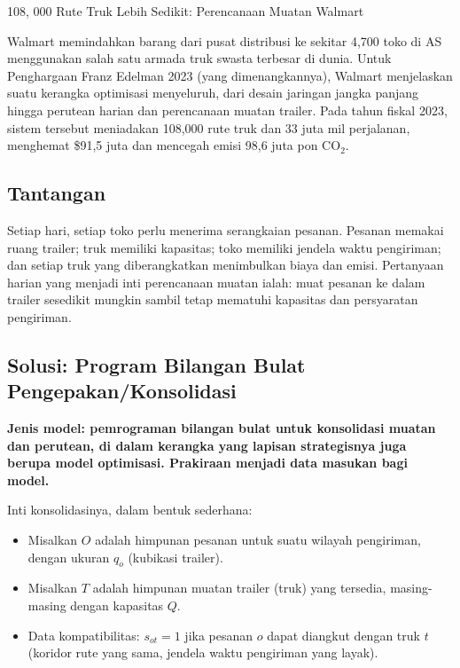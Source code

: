 \begin{casestudybox}{108{,}
\label{case:walmart-loads}000 Rute Truk Lebih Sedikit: Perencanaan Muatan Walmart}

Walmart memindahkan barang dari pusat distribusi ke sekitar 4{,}700 toko di AS menggunakan salah satu armada truk swasta terbesar di dunia. Untuk Penghargaan Franz Edelman 2023 (yang dimenangkannya), Walmart menjelaskan suatu kerangka optimisasi menyeluruh, dari desain jaringan jangka panjang hingga perutean harian dan perencanaan muatan trailer. Pada tahun fiskal 2023, sistem tersebut meniadakan 108{,}000 rute truk dan 33 juta mil perjalanan, menghemat \$91,5 juta dan mencegah emisi 98,6 juta pon CO$_2$.

\subsection*{Tantangan}
Setiap hari, setiap toko perlu menerima serangkaian pesanan. Pesanan memakai ruang trailer; truk memiliki kapasitas; toko memiliki jendela waktu pengiriman; dan setiap truk yang diberangkatkan menimbulkan biaya dan emisi. Pertanyaan harian yang menjadi inti perencanaan muatan ialah: muat pesanan ke dalam trailer sesedikit mungkin sambil tetap mematuhi kapasitas dan persyaratan pengiriman.

\subsection*{Solusi: Program Bilangan Bulat Pengepakan/Konsolidasi}
\textbf{Jenis model: pemrograman bilangan bulat untuk konsolidasi muatan dan perutean, di dalam kerangka yang lapisan strategisnya juga berupa model optimisasi. Prakiraan menjadi data masukan bagi model.}

Inti konsolidasinya, dalam bentuk sederhana:

\begin{itemize}
\item Misalkan $O$ adalah himpunan pesanan untuk suatu wilayah pengiriman, dengan ukuran $q_o$ (kubikasi trailer).
\item Misalkan $T$ adalah himpunan muatan trailer (truk) yang tersedia, masing-masing dengan kapasitas $Q$.
\item Data kompatibilitas: $s_{ot} = 1$ jika pesanan $o$ dapat diangkut dengan truk $t$ (koridor rute yang sama, jendela waktu pengiriman yang layak).
\end{itemize}


\end{casestudybox}
